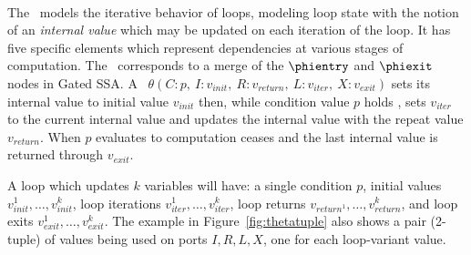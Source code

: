 {\paragraph{\Tns}
The \Tn\ models the iterative behavior of loops, modeling loop state with the notion of an \emph{internal value} which may be updated on each iteration of the loop. 
It has five specific elements which represent dependencies at various stages of computation. 
The \Tn\ corresponds to a merge of the $\phientry$ and $\phiexit$ nodes in Gated SSA.
%
A \Tn\ $\theta(C:p,\ I:v_\textit{init},\ R:v_\textit{return},\ L: v_\textit{iter},\ X:v_{exit})$ sets its internal value to initial value $v_\textit{init}$ then, while condition value $p$ holds \true, sets $v_\textit{iter}$ to the current internal value and updates the internal value with the repeat value $v_\textit{return}$. 
When $p$ evaluates to \false computation ceases and the last internal value is returned through $v_\textit{exit}$.

%
A loop which updates $k$ variables will have: 
a single condition $p$, initial values $v_{\textit{init}}^1,\ldots,v_{\textit{init}}^k$, loop iterations $v_{\textit{iter}}^1,\ldots,v_{\textit{iter}}^k$, loop returns $v_{\textit{return}^1},\ldots,v_{\textit{return}}^k$, and loop exits $v_{\textit{exit}}^1,\ldots,v_{\textit{exit}}^k$.
The example in Figure~\ref{fig:thetatuple} also shows a pair (2-tuple) of values being used on ports $I,R,L,X$, one for each loop-variant value.

\begin{figure}[!ht]
  \centering
  \hfill


\end{figure}}
